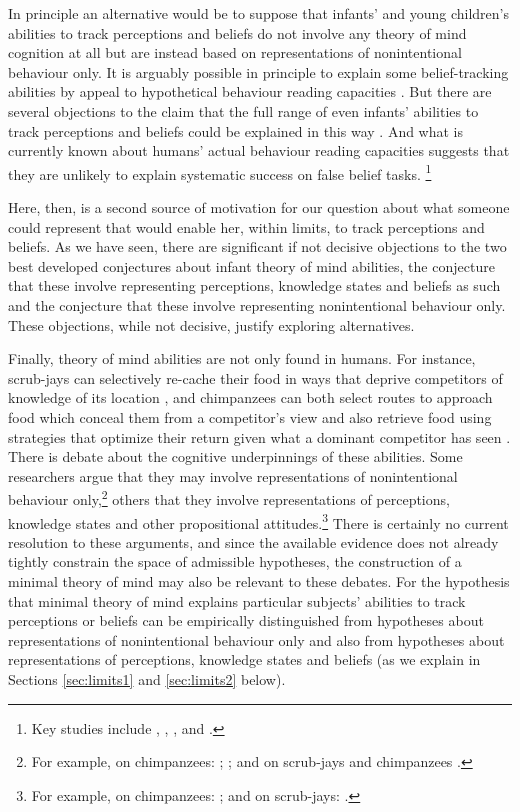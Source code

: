 \documentclass[12pt,\papersize]{extarticle}
\begin{document}
In principle an alternative would be to suppose that infants' and young children's abilities to track perceptions and beliefs 
do not involve any theory of mind cognition at all
but are instead based on 
representations of nonintentional behaviour only.
It is arguably possible in principle to explain some belief-tracking abilities by appeal to hypothetical behaviour reading capacities  \citep{perner:1988_developing,en_1168, en_1169}.
But there are several objections to the claim that the full range of even infants' abilities to track perceptions and beliefs could be explained in this way \citep{en_1691,Apperly:2009ju}.  
And what is currently known about humans' actual behaviour reading capacities suggests that they are unlikely to explain systematic success on false belief tasks.%
\footnote{
Key studies include
	\citet{Newtson:1976ni}, 
	\citet{Byrne:1999jk},
	\citet{Baldwin:2001rs},
	\citet{Saylor:2007pj} and
	\citet{Baldwin:2008mw}.
} 
 
Here, then, is a second source of motivation for our question about what someone could represent that would enable her, within limits, to track perceptions and beliefs.
As we have seen, there are significant if not decisive objections to the two best developed conjectures about infant theory of mind abilities, the conjecture that these involve representing perceptions, knowledge states and beliefs as such and the conjecture that these involve representing nonintentional behaviour only.  
These objections, while not decisive, justify exploring alternatives.

Finally, theory of mind abilities are not only found in humans.
For instance,
scrub-jays can selectively re-cache their food in ways that deprive competitors of knowledge of its location \citep{Clayton:2007fh}, and  chimpanzees can both select routes to approach food which conceal them from a competitor’s view \citep[]{en_1546} and also retrieve food using strategies that optimize their return given what a dominant competitor has seen \citep[]{en_1545}.  
There is debate about the cognitive underpinnings of these abilities. 
Some researchers argue that they may involve representations of nonintentional behaviour only,\footnote{
For example, on chimpanzees: 
	\citet{povinelli:2004vonk}; 
	\citet[pp.\ 364-5]{Vonk:2006cq}; and on scrub-jays and chimpanzees \citet{Penn:2007ey}.
} 
others that they involve representations of perceptions, knowledge states and other propositional attitudes.\footnote{
For example, on chimpanzees: \citet{Tomasello:2005ce,
			Call:2008di}; and on scrub-jays: 
			\citet[p.\ 73]{Emery:2007ze}.
}
There is certainly no current resolution to these arguments,
and since the available evidence does not already tightly constrain the space of admissible hypotheses,
the construction of a minimal theory of mind may also be relevant to these debates.
For the hypothesis that minimal theory of mind explains particular subjects' abilities to track perceptions or beliefs can be empirically distinguished from hypotheses about representations of nonintentional behaviour only and also from hypotheses about representations of perceptions, knowledge states and beliefs (as we explain in Sections \ref{sec:limits1} and \ref{sec:limits2} below).
\end{document}
